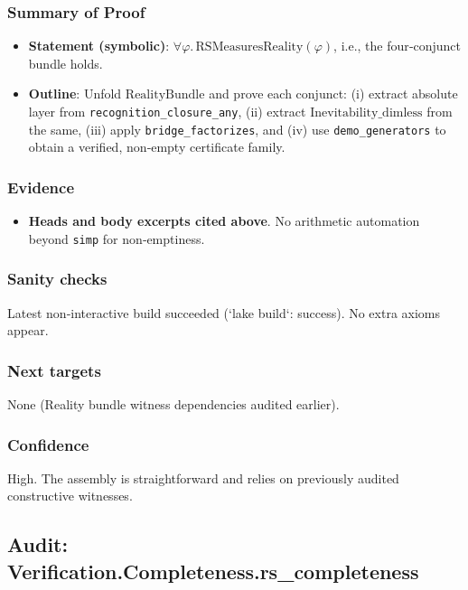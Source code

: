 \documentclass{article}
\begin{document}
\subsubsection{Summary of Proof}
\begin{itemize}[leftmargin=*]
  \item \textbf{Statement (symbolic)}: \(\forall \varphi.\,\mathrm{RSMeasuresReality}(\varphi)\), i.e., the four‑conjunct bundle holds.
  \item \textbf{Outline}: Unfold \(\mathrm{RealityBundle}\) and prove each conjunct: (i) extract absolute layer from \texttt{recognition\_closure\_any}, (ii) extract \(\mathrm{Inevitability\_dimless}\) from the same, (iii) apply \texttt{bridge\_factorizes}, and (iv) use \texttt{demo\_generators} to obtain a verified, non‑empty certificate family.
\end{itemize}

\subsubsection{Evidence}
\begin{itemize}[leftmargin=*]
  \item \textbf{Heads and body excerpts cited above}. No arithmetic automation beyond \texttt{simp} for non‑emptiness.
\end{itemize}

\subsubsection{Sanity checks}
Latest non‑interactive build succeeded (`lake build`: success). No extra axioms appear.

\subsubsection{Next targets}
None (Reality bundle witness dependencies audited earlier).

\subsubsection{Confidence}
High. The assembly is straightforward and relies on previously audited constructive witnesses.

\subsection{Audit: Verification.Completeness.rs\_completeness}
\end{document}
